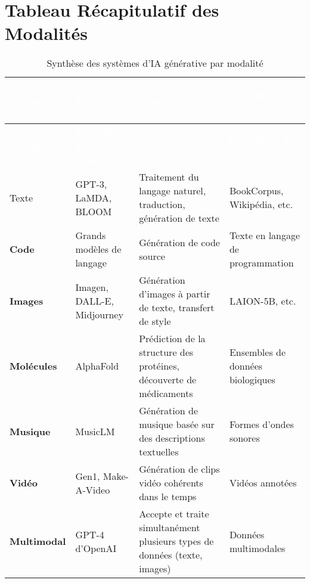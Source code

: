 \documentclass[12pt,a4paper]{article}
\begin{document}
\newpage
\section{Tableau Récapitulatif des Modalités}
\vspace{0.5cm}


\begingroup
\setlength{\tabcolsep}{10pt} %
\renewcommand{\arraystretch}{1.5} %

\begin{longtable}{>{\bfseries}l >{\raggedright\arraybackslash}p{3cm} >{\raggedright\arraybackslash}p{5cm} >{\raggedright\arraybackslash}p{2.5cm}}
\caption{Synthèse des systèmes d'IA générative par modalité}
\label{tab:modalites}\\
\toprule
\rowcolor{headerblue!90}\textcolor{white}{\textbf{Modalité}} & 
\textcolor{white}{\textbf{Exemples de systèmes}} & 
\textcolor{white}{\textbf{Capacités}} & 
\textcolor{white}{\textbf{Ensembles de données}} \\
\midrule
\endfirsthead

\toprule[1.5pt]
\rowcolor{headerblue!90}\textcolor{white}{\textbf{Modalité}} & 
\textcolor{white}{\textbf{Exemples de systèmes}} & 
\textcolor{white}{\textbf{Capacités}} & 
\textcolor{white}{\textbf{Ensembles de données}} \\
\midrule
\endhead

\bottomrule[1.5pt]
\endfoot

\rowcolor{lightgray!30}
Texte & 
GPT-3, LaMDA, BLOOM & 
Traitement du langage naturel, traduction, génération de texte & 
BookCorpus, Wikipédia, etc. \\

\rowcolor{white}
Code & 
Grands modèles de langage & 
Génération de code source & 
Texte en langage de programmation \\

\rowcolor{lightgray!30}
Images & 
Imagen, DALL-E, Midjourney & 
Génération d'images à partir de texte, transfert de style & 
LAION-5B, etc. \\

\rowcolor{white}
Molécules & 
AlphaFold & 
Prédiction de la structure des protéines, découverte de médicaments & 
Ensembles de données biologiques \\

\rowcolor{lightgray!30}
Musique & 
MusicLM & 
Génération de musique basée sur des descriptions textuelles & 
Formes d'ondes sonores \\

\rowcolor{white}
Vidéo & 
Gen1, Make-A-Video & 
Génération de clips vidéo cohérents dans le temps & 
Vidéos annotées \\

\rowcolor{lightgray!30}
Multimodal & 
GPT-4 d'OpenAI & 
Accepte et traite simultanément plusieurs types de données (texte, images) & 
Données multimodales \\

\end{longtable}
\endgroup
\end{document}
